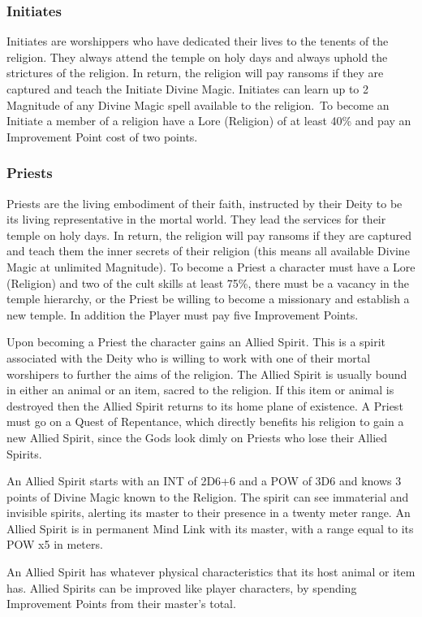 \subsubsection{Initiates}
Initiates are worshippers who have dedicated their lives to the tenents of the religion. They always attend the temple on holy days and always uphold the strictures of the religion. In return, the religion will pay ransoms if they are captured and teach the Initiate Divine Magic. Initiates can learn up to 2 Magnitude of any Divine Magic spell available to the religion. To become an Initiate a member of a religion have a Lore (Religion) of at least 40\% and pay an Improvement Point cost of two points.

\subsubsection{Priests}
Priests are the living embodiment of their faith, instructed by their Deity to be its living representative in the mortal world. They lead the services for their temple on holy days. In return, the religion will pay ransoms if they are captured and teach them the inner secrets of their religion (this means all available Divine Magic at unlimited Magnitude). To become a Priest a character must have a Lore (Religion) and two of the cult skills at least 75\%, there must be a vacancy in the temple hierarchy, or the Priest be willing to become a missionary and establish a new temple. In addition the Player must pay five Improvement Points.

Upon becoming a Priest the character gains an Allied Spirit. This is a spirit associated with the Deity who is willing to work with one of their mortal worshipers to further the aims of the religion. The Allied Spirit is usually bound in either an animal or an item, sacred to the religion. If this item or animal is destroyed then the Allied Spirit returns to its home plane of existence. A Priest must go on a Quest of Repentance, which directly benefits his religion to gain a new Allied Spirit, since the Gods look dimly on Priests who lose their Allied Spirits.

An Allied Spirit starts with an INT of 2D6+6 and a POW of 3D6 and knows 3 points of Divine Magic known to the Religion. The spirit can see immaterial and invisible spirits, alerting its master to their presence in a twenty meter range. An Allied Spirit is in permanent Mind Link with its master, with a range equal to its POW x5 in meters. 

An Allied Spirit has whatever physical characteristics that its host animal or item has. Allied Spirits can be improved like player characters, by spending Improvement Points from their master’s total.


